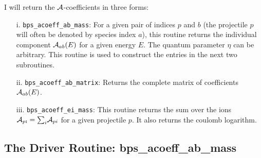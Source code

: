 \documentclass[preprint,12pt,eqsecnum,nofootinbib,amsmath,amssymb]{revtex4}
\newcommand{\smI}{{\rm\scriptscriptstyle I}}
\begin{document}
I will return the ${\cal A}$-coefficients in three forms:
\begin{enumerate}
  \baselineskip 10pt plus 1pt minus 1pt
  \setlength{\itemsep}{3pt} %
  \setlength{\parskip}{1pt} %
  \setlength{\parsep}{0pt}  %

\item[i.] \verb+bps_acoeff_ab_mass+: For a given pair of indices $p$
and $b$ (the projectile $p$ will often be denoted by species index
$a$), this routine returns the individual component ${\cal A}_{ab}(E)$
for a given energy $E$. The quantum parameter $\eta$ can be arbitrary. 
This routine is used to construct the entries in the next two subroutines.

\item[ii.] \verb+bps_acoeff_ab_matrix+: Returns the complete
matrix of coefficients ${\cal A}_{ab}(E)$. 


\item[iii.] \verb+bps_acoeff_ei_mass+: This routine returns the sum
over the ions ${\cal A}_{p\smI}={\sum}_i {\cal A}_{pi}$ for a given
projectile $p$. It also returns the coulomb logarithm.

\end{enumerate}

\subsection{The Driver Routine:
\lowercase{bps}\_\lowercase{acoeff}\_\lowercase{ab}\_\lowercase{mass}}
\end{document}
